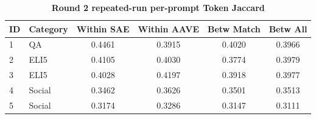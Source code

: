 \begin{table}[htbp]
\centering
\caption{\textbf{Round 2 repeated-run per-prompt Token Jaccard}}
\label{tab:round2-repeated-token-jaccard-per-prompt}
\renewcommand{\arraystretch}{1.4}
\begin{tabular}{|l|l|c|c|c|c|}
\hline
\textbf{ID} & \textbf{Category} & \textbf{Within SAE} & \textbf{Within AAVE} & \textbf{Betw Match} & \textbf{Betw All} \\
\hline
1 & QA & 0.4461 & 0.3915 & 0.4020 & 0.3966 \\
\hline
2 & ELI5 & 0.4105 & 0.4030 & 0.3774 & 0.3979 \\
\hline
3 & ELI5 & 0.4028 & 0.4197 & 0.3918 & 0.3977 \\
\hline
4 & Social & 0.3462 & 0.3626 & 0.3501 & 0.3513 \\
\hline
5 & Social & 0.3174 & 0.3286 & 0.3147 & 0.3111 \\
\hline
\end{tabular}
\end{table}
